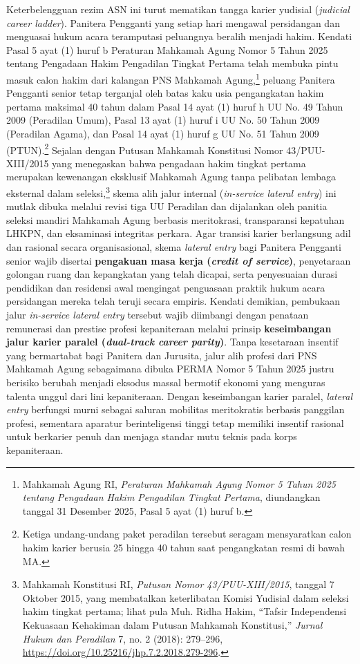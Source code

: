 \documentclass[12pt,a4paper,twocolumn]{article}
\begin{document}
\begin{enumerate}
          Keterbelengguan rezim ASN ini turut mematikan tangga karier yudisial (\textit{judicial career ladder}). Panitera Pengganti yang setiap hari mengawal persidangan dan menguasai hukum acara teramputasi peluangnya beralih menjadi hakim. Kendati Pasal 5 ayat (1) huruf b Peraturan Mahkamah Agung Nomor 5 Tahun 2025 tentang Pengadaan Hakim Pengadilan Tingkat Pertama telah membuka pintu masuk calon hakim dari kalangan PNS Mahkamah Agung,\footnote{Mahkamah Agung RI, \textit{Peraturan Mahkamah Agung Nomor 5 Tahun 2025 tentang Pengadaan Hakim Pengadilan Tingkat Pertama}, diundangkan tanggal 31 Desember 2025, Pasal 5 ayat (1) huruf b.} peluang Panitera Pengganti senior tetap terganjal oleh batas kaku usia pengangkatan hakim pertama maksimal 40 tahun dalam Pasal 14 ayat (1) huruf h UU No. 49 Tahun 2009 (Peradilan Umum), Pasal 13 ayat (1) huruf i UU No. 50 Tahun 2009 (Peradilan Agama), dan Pasal 14 ayat (1) huruf g UU No. 51 Tahun 2009 (PTUN).\footnote{Ketiga undang-undang paket peradilan tersebut seragam mensyaratkan calon hakim karier berusia 25 hingga 40 tahun saat pengangkatan resmi di bawah MA.} Sejalan dengan Putusan Mahkamah Konstitusi Nomor 43/PUU-XIII/2015 yang menegaskan bahwa pengadaan hakim tingkat pertama merupakan kewenangan eksklusif Mahkamah Agung tanpa pelibatan lembaga eksternal dalam seleksi,\footnote{Mahkamah Konstitusi RI, \textit{Putusan Nomor 43/PUU-XIII/2015}, tanggal 7 Oktober 2015, yang membatalkan keterlibatan Komisi Yudisial dalam seleksi hakim tingkat pertama; lihat pula Muh. Ridha Hakim, ``Tafsir Independensi Kekuasaan Kehakiman dalam Putusan Mahkamah Konstitusi,'' \textit{Jurnal Hukum dan Peradilan} 7, no. 2 (2018): 279--296, \url{https://doi.org/10.25216/jhp.7.2.2018.279-296}.} skema alih jalur internal (\textit{in-service lateral entry}) ini mutlak dibuka melalui revisi tiga UU Peradilan dan dijalankan oleh panitia seleksi mandiri Mahkamah Agung berbasis meritokrasi, transparansi kepatuhan LHKPN, dan eksaminasi integritas perkara. Agar transisi karier berlangsung adil dan rasional secara organisasional, skema \textit{lateral entry} bagi Panitera Pengganti senior wajib disertai \textbf{pengakuan masa kerja (\textit{credit of service})}, penyetaraan golongan ruang dan kepangkatan yang telah dicapai, serta penyesuaian durasi pendidikan dan residensi awal mengingat penguasaan praktik hukum acara persidangan mereka telah teruji secara empiris. Kendati demikian, pembukaan jalur \textit{in-service lateral entry} tersebut wajib diimbangi dengan penataan remunerasi dan prestise profesi kepaniteraan melalui prinsip \textbf{keseimbangan jalur karier paralel (\textit{dual-track career parity})}. Tanpa kesetaraan insentif yang bermartabat bagi Panitera dan Jurusita, jalur alih profesi dari PNS Mahkamah Agung sebagaimana dibuka PERMA Nomor 5 Tahun 2025 justru berisiko berubah menjadi eksodus massal bermotif ekonomi yang menguras talenta unggul dari lini kepaniteraan. Dengan keseimbangan karier paralel, \textit{lateral entry} berfungsi murni sebagai saluran mobilitas meritokratis berbasis panggilan profesi, sementara aparatur berinteligensi tinggi tetap memiliki insentif rasional untuk berkarier penuh dan menjaga standar mutu teknis pada korps kepaniteraan.
\end{enumerate}
\end{document}
